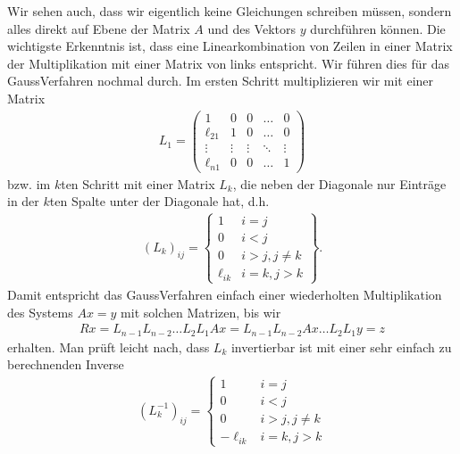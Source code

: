 \documentclass[letterpaper,10pt,english]{jupyterBook}
\begin{document}
Wir sehen auch, dass wir eigentlich keine Gleichungen schreiben müssen, sondern alles direkt auf Ebene der Matrix \(A\) und des Vektors \(y\) durchführen können. Die wichtigste Erkenntnis ist, dass eine Linearkombination von Zeilen in einer Matrix der Multiplikation mit einer Matrix von links entspricht. Wir führen dies für das Gauss\sphinxhyphen{}Verfahren nochmal durch. Im ersten Schritt multiplizieren wir mit einer Matrix
\begin{equation*}
\begin{split}L_1 = \left( \begin{matrix} 1 & 0 & 0 & \ldots & 0 \\ \ell_{21} & 1 & 0 &\ldots & 0 \\
\vdots & \vdots & \vdots & \ddots & \vdots \\ \ell_{n1} & 0 & 0 & \ldots & 1 \end{matrix} \right)\end{split}
\end{equation*}
bzw. im \(k\)\sphinxhyphen{}ten Schritt mit einer Matrix \(L_k\), die neben der Diagonale nur Einträge in der \(k\)\sphinxhyphen{}ten Spalte unter der Diagonale hat, d.h.
\begin{equation*}
\begin{split}(L_k)_{ij} = \left\{ 
\begin{matrix} 
1 & i=j \\ 0 & i < j \\ 
0 & i > j, j \neq k \\ 
\ell_{ik} & i=k,j >k
\end{matrix}
\right\}.\end{split}
\end{equation*}
Damit entspricht das Gauss\sphinxhyphen{}Verfahren einfach einer wiederholten Multiplikation des Systems \(Ax=y\) mit solchen Matrizen, bis wir
\begin{equation*}
\begin{split} Rx = L_{n-1} L_{n-2} \ldots L_2 L_1 A x = L_{n-1} L_{n-2} Ax  \ldots L_2 L_1 y = z\end{split}
\end{equation*}
erhalten. Man prüft leicht nach, dass \(L_k\) invertierbar ist mit einer sehr einfach zu berechnenden Inverse
\begin{equation*}
\begin{split}(L_k^{-1})_{ij} = \left\{ \begin{matrix} 1 & i=j \\ 0 & i < j \\ 0 & i > j, j \neq k \\ - \ell_{ik} & i=k,j > k\end{matrix}\right.\end{split}
\end{equation*}
\end{document}
